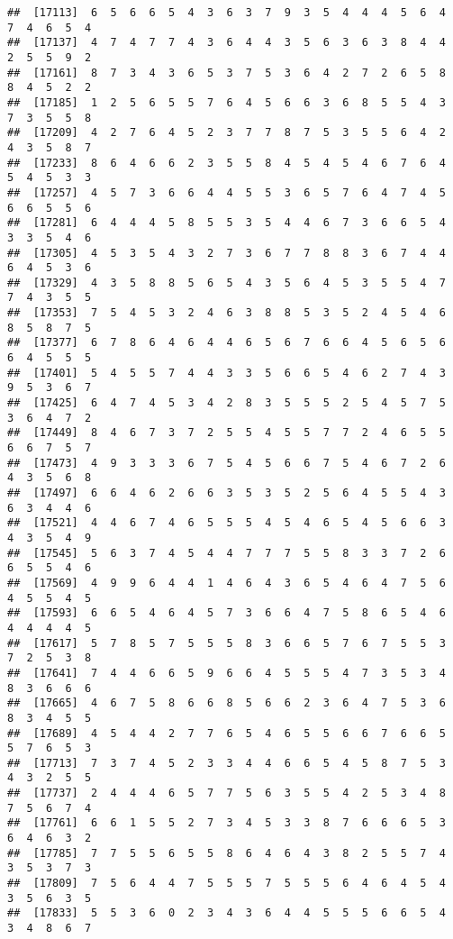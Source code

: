 \documentclass[
]{book}
\begin{document}
\begin{verbatim}
##  [17113]  6  5  6  6  5  4  3  6  3  7  9  3  5  4  4  4  5  6  4  7  4  6  5  4
##  [17137]  4  7  4  7  7  4  3  6  4  4  3  5  6  3  6  3  8  4  4  2  5  5  9  2
##  [17161]  8  7  3  4  3  6  5  3  7  5  3  6  4  2  7  2  6  5  8  8  4  5  2  2
##  [17185]  1  2  5  6  5  5  7  6  4  5  6  6  3  6  8  5  5  4  3  7  3  5  5  8
##  [17209]  4  2  7  6  4  5  2  3  7  7  8  7  5  3  5  5  6  4  2  4  3  5  8  7
##  [17233]  8  6  4  6  6  2  3  5  5  8  4  5  4  5  4  6  7  6  4  5  4  5  3  3
##  [17257]  4  5  7  3  6  6  4  4  5  5  3  6  5  7  6  4  7  4  5  6  6  5  5  6
##  [17281]  6  4  4  4  5  8  5  5  3  5  4  4  6  7  3  6  6  5  4  3  3  5  4  6
##  [17305]  4  5  3  5  4  3  2  7  3  6  7  7  8  8  3  6  7  4  4  6  4  5  3  6
##  [17329]  4  3  5  8  8  5  6  5  4  3  5  6  4  5  3  5  5  4  7  7  4  3  5  5
##  [17353]  7  5  4  5  3  2  4  6  3  8  8  5  3  5  2  4  5  4  6  8  5  8  7  5
##  [17377]  6  7  8  6  4  6  4  4  6  5  6  7  6  6  4  5  6  5  6  6  4  5  5  5
##  [17401]  5  4  5  5  7  4  4  3  3  5  6  6  5  4  6  2  7  4  3  9  5  3  6  7
##  [17425]  6  4  7  4  5  3  4  2  8  3  5  5  5  2  5  4  5  7  5  3  6  4  7  2
##  [17449]  8  4  6  7  3  7  2  5  5  4  5  5  7  7  2  4  6  5  5  6  6  7  5  7
##  [17473]  4  9  3  3  3  6  7  5  4  5  6  6  7  5  4  6  7  2  6  4  3  5  6  8
##  [17497]  6  6  4  6  2  6  6  3  5  3  5  2  5  6  4  5  5  4  3  6  3  4  4  6
##  [17521]  4  4  6  7  4  6  5  5  5  4  5  4  6  5  4  5  6  6  3  4  3  5  4  9
##  [17545]  5  6  3  7  4  5  4  4  7  7  7  5  5  8  3  3  7  2  6  6  5  5  4  6
##  [17569]  4  9  9  6  4  4  1  4  6  4  3  6  5  4  6  4  7  5  6  4  5  5  4  5
##  [17593]  6  6  5  4  6  4  5  7  3  6  6  4  7  5  8  6  5  4  6  4  4  4  4  5
##  [17617]  5  7  8  5  7  5  5  5  8  3  6  6  5  7  6  7  5  5  3  7  2  5  3  8
##  [17641]  7  4  4  6  6  5  9  6  6  4  5  5  5  4  7  3  5  3  4  8  3  6  6  6
##  [17665]  4  6  7  5  8  6  6  8  5  6  6  2  3  6  4  7  5  3  6  8  3  4  5  5
##  [17689]  4  5  4  4  2  7  7  6  5  4  6  5  5  6  6  7  6  6  5  5  7  6  5  3
##  [17713]  7  3  7  4  5  2  3  3  4  4  6  6  5  4  5  8  7  5  3  4  3  2  5  5
##  [17737]  2  4  4  4  6  5  7  7  5  6  3  5  5  4  2  5  3  4  8  7  5  6  7  4
##  [17761]  6  6  1  5  5  2  7  3  4  5  3  3  8  7  6  6  6  5  3  6  4  6  3  2
##  [17785]  7  7  5  5  6  5  5  8  6  4  6  4  3  8  2  5  5  7  4  3  5  3  7  3
##  [17809]  7  5  6  4  4  7  5  5  5  7  5  5  5  6  4  6  4  5  4  3  5  6  3  5
##  [17833]  5  5  3  6  0  2  3  4  3  6  4  4  5  5  5  6  6  5  4  3  4  8  6  7

\end{verbatim}
\end{document}
